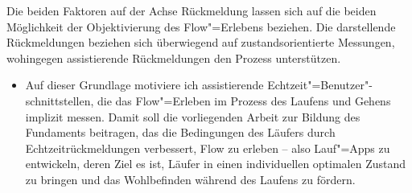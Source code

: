 Die beiden Faktoren auf der Achse Rückmeldung lassen sich auf die beiden Möglichkeit der Objektivierung des Flow"=Erlebens beziehen. Die darstellende Rückmeldungen beziehen sich überwiegend auf zustandsorientierte Messungen, wohingegen assistierende Rückmeldungen den Prozess unterstützen. 
\begin{itemize}
	
	\item Auf dieser Grundlage motiviere ich assistierende Echtzeit"=Benutzer"-schnittstellen, die das Flow"=Erleben im Prozess des Laufens und Gehens implizit messen. Damit soll die vorliegenden Arbeit zur Bildung des Fundaments beitragen, das die Bedingungen des Läufers durch Echtzeitrückmeldungen verbessert, Flow zu erleben -- also Lauf"=Apps zu entwickeln, deren Ziel es ist, Läufer in einen individuellen optimalen Zustand zu bringen und das Wohlbefinden während des Laufens zu fördern. 
\end{itemize}

